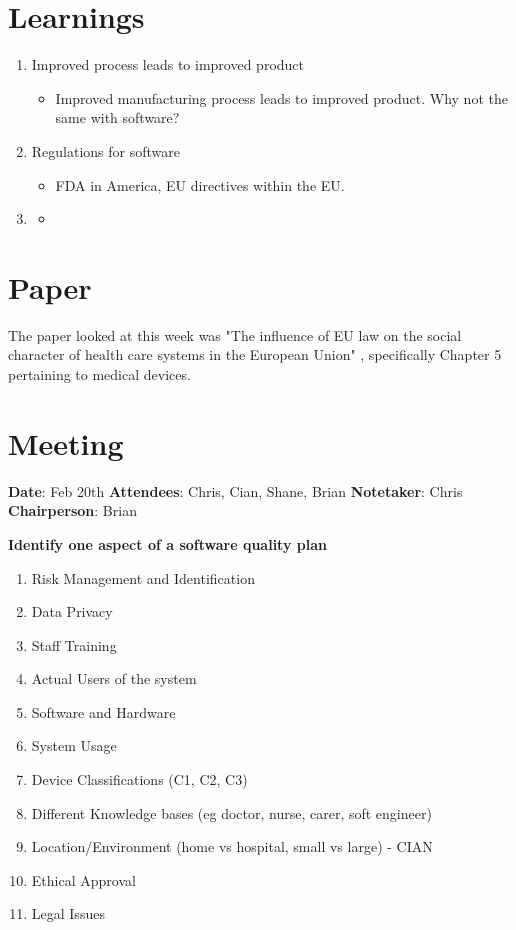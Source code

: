 \section{Learnings}
\begin{enumerate}
\item Improved process leads to improved product
\begin{itemize}
\item Improved manufacturing process leads to improved product. Why not the same with software?
\end{itemize}
\item Regulations for software
\begin{itemize}
\item FDA in America, EU directives within the EU.
\end{itemize}
\item
\begin{itemize}
\item
\end{itemize}
\end{enumerate}

\section{Paper}

The paper looked at this week was "The influence of EU law on the social character of health care systems in the European Union"  \parencite{week3}, specifically Chapter 5 pertaining to medical devices. 

\section{Meeting}

\textbf{Date}: Feb 20th\newline
\textbf{Attendees}: Chris, Cian, Shane, Brian\newline
\textbf{Notetaker}: Chris\newline
\textbf{Chairperson}: Brian\newline \newline

\textbf{Identify one aspect of a software quality plan}
\begin{enumerate}
\item Risk Management and Identification
\item Data Privacy 
\item Staff Training
\item Actual Users of the system
\item Software and Hardware
\item System Usage
\item Device Classifications (C1, C2, C3)
\item Different Knowledge bases (eg doctor, nurse, carer, soft engineer)
\item Location/Environment (home vs hospital, small vs large) - CIAN
\item Ethical Approval
\item Legal Issues
\end{enumerate}

